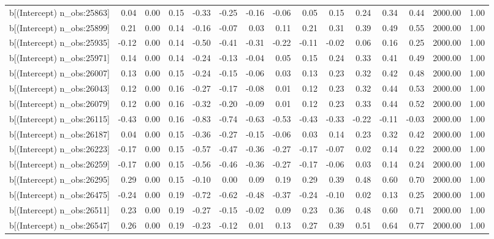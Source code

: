 \begin{table}[ht]
\begin{tabular}{rrrrrrrrrrrrrrr}
  b[(Intercept) n\_obs:25863] & 0.04 & 0.00 & 0.15 & -0.33 & -0.25 & -0.16 & -0.06 & 0.05 & 0.15 & 0.24 & 0.34 & 0.44 & 2000.00 & 1.00 \\ 
  b[(Intercept) n\_obs:25899] & 0.21 & 0.00 & 0.14 & -0.16 & -0.07 & 0.03 & 0.11 & 0.21 & 0.31 & 0.39 & 0.49 & 0.55 & 2000.00 & 1.00 \\ 
  b[(Intercept) n\_obs:25935] & -0.12 & 0.00 & 0.14 & -0.50 & -0.41 & -0.31 & -0.22 & -0.11 & -0.02 & 0.06 & 0.16 & 0.25 & 2000.00 & 1.00 \\ 
  b[(Intercept) n\_obs:25971] & 0.14 & 0.00 & 0.14 & -0.24 & -0.13 & -0.04 & 0.05 & 0.15 & 0.24 & 0.33 & 0.41 & 0.49 & 2000.00 & 1.00 \\ 
  b[(Intercept) n\_obs:26007] & 0.13 & 0.00 & 0.15 & -0.24 & -0.15 & -0.06 & 0.03 & 0.13 & 0.23 & 0.32 & 0.42 & 0.48 & 2000.00 & 1.00 \\ 
  b[(Intercept) n\_obs:26043] & 0.12 & 0.00 & 0.16 & -0.27 & -0.17 & -0.08 & 0.01 & 0.12 & 0.23 & 0.32 & 0.44 & 0.53 & 2000.00 & 1.00 \\ 
  b[(Intercept) n\_obs:26079] & 0.12 & 0.00 & 0.16 & -0.32 & -0.20 & -0.09 & 0.01 & 0.12 & 0.23 & 0.33 & 0.44 & 0.52 & 2000.00 & 1.00 \\ 
  b[(Intercept) n\_obs:26115] & -0.43 & 0.00 & 0.16 & -0.83 & -0.74 & -0.63 & -0.53 & -0.43 & -0.33 & -0.22 & -0.11 & -0.03 & 2000.00 & 1.00 \\ 
  b[(Intercept) n\_obs:26187] & 0.04 & 0.00 & 0.15 & -0.36 & -0.27 & -0.15 & -0.06 & 0.03 & 0.14 & 0.23 & 0.32 & 0.42 & 2000.00 & 1.00 \\ 
  b[(Intercept) n\_obs:26223] & -0.17 & 0.00 & 0.15 & -0.57 & -0.47 & -0.36 & -0.27 & -0.17 & -0.07 & 0.02 & 0.14 & 0.22 & 2000.00 & 1.00 \\ 
  b[(Intercept) n\_obs:26259] & -0.17 & 0.00 & 0.15 & -0.56 & -0.46 & -0.36 & -0.27 & -0.17 & -0.06 & 0.03 & 0.14 & 0.24 & 2000.00 & 1.00 \\ 
  b[(Intercept) n\_obs:26295] & 0.29 & 0.00 & 0.15 & -0.10 & 0.00 & 0.09 & 0.19 & 0.29 & 0.39 & 0.48 & 0.60 & 0.70 & 2000.00 & 1.00 \\ 
  b[(Intercept) n\_obs:26475] & -0.24 & 0.00 & 0.19 & -0.72 & -0.62 & -0.48 & -0.37 & -0.24 & -0.10 & 0.02 & 0.13 & 0.25 & 2000.00 & 1.00 \\ 
  b[(Intercept) n\_obs:26511] & 0.23 & 0.00 & 0.19 & -0.27 & -0.15 & -0.02 & 0.09 & 0.23 & 0.36 & 0.48 & 0.60 & 0.71 & 2000.00 & 1.00 \\ 
  b[(Intercept) n\_obs:26547] & 0.26 & 0.00 & 0.19 & -0.23 & -0.12 & 0.01 & 0.13 & 0.27 & 0.39 & 0.51 & 0.64 & 0.77 & 2000.00 & 1.00 \\ 

\end{tabular}
\end{table}
